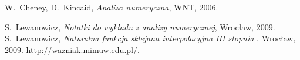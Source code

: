 \documentclass[11pt,leqno]{article}
\begin{document}
\thispagestyle{empty}
\begin{thebibliography}{99}

 W.~Cheney, D.~Kincaid, \textit{Analiza numeryczna\/}, WNT, 2006.

   S.~Lewanowicz, \textit{Notatki do wykładu z analizy numerycznej},
              Wrocław, 2009.
 S.~Lewanowicz, \textit{Naturalna funkcja sklejana interpolacyjna III stopnia },
              Wrocław, 2009. 
 http://wazniak.mimuw.edu.pl/.

	  
\end{thebibliography}
\end{document}
